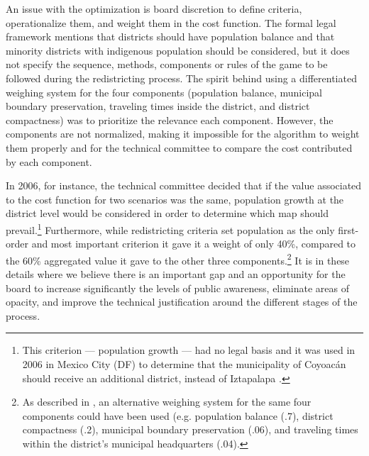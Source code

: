 \documentclass[letter,12pt]{article}
\begin{document}
An issue with the optimization is board discretion to define criteria, operationalize them, and weight them in the cost function. The formal legal framework mentions that districts should have population balance and that minority districts with indigenous population should be considered, but it does not specify the sequence, methods, components or rules of the game to be followed during the redistricting process. The spirit behind using a differentiated weighing system for the four components (population balance, municipal boundary preservation, traveling times inside the district, and district compactness) was to prioritize the relevance each component. However, the components are not normalized, making it impossible for the algorithm to weight them properly and for the technical committee to compare the cost contributed by each component.

In 2006, for instance, the technical committee decided that if the value associated to the cost function for two scenarios was the same, population growth at the district level would be considered in order to determine which map should prevail.\footnote{This criterion --- population growth --- had no legal basis and it was used in 2006 in Mexico City (DF) to determine that the municipality of Coyoac\'an should receive an additional district, instead of Iztapalapa \citep{memorias.ife.2005}.}  Furthermore, while redistricting criteria \citep{acuerdo.ife.2004,acuerdo.ife.2013} set population as the only first-order and most important criterion it gave it a weight of only 40\%, compared to the 60\% aggregated value it gave to the other three components.\footnote{As described in \citep{trelles.mtz.tesisItam.2007}, an alternative weighing system for the same four components could have been used (e.g. population balance (.7), district compactness (.2), municipal boundary preservation (.06), and traveling times within the district's municipal headquarters (.04).}  It is in these details where we believe there is an important gap and an opportunity for the board to increase significantly the levels of public awareness, eliminate areas of opacity, and improve the technical justification around the different stages of the process.

\end{document}
